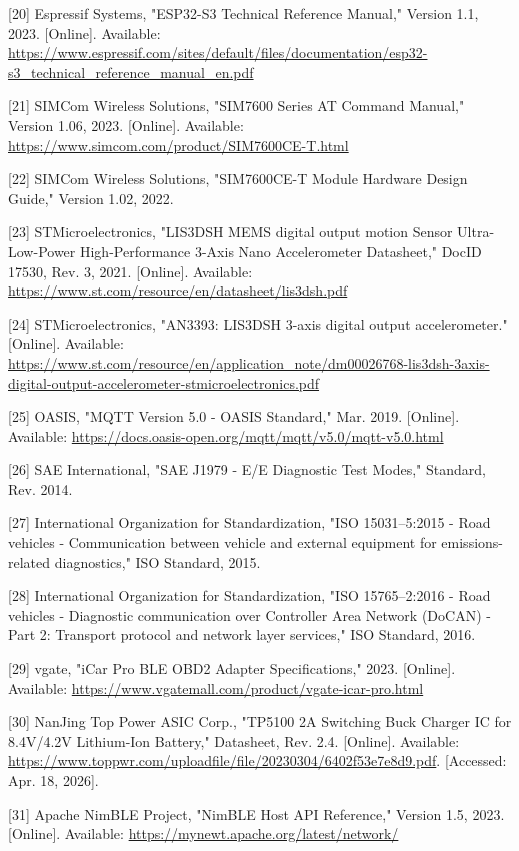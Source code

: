 \documentclass[a4paper]{extarticle}
\begin{document}
{[}20{]} Espressif Systems, "ESP32-S3 Technical Reference Manual,"
Version 1.1, 2023. {[}Online{]}. Available:
\url{https://www.espressif.com/sites/default/files/documentation/esp32-s3_technical_reference_manual_en.pdf}

{[}21{]} SIMCom Wireless Solutions, "SIM7600 Series AT Command Manual,"
Version 1.06, 2023. {[}Online{]}. Available:
\url{https://www.simcom.com/product/SIM7600CE-T.html}

{[}22{]} SIMCom Wireless Solutions, "SIM7600CE-T Module Hardware Design
Guide," Version 1.02, 2022.

{[}23{]} STMicroelectronics, "LIS3DSH MEMS digital output motion
Sensor Ultra-Low-Power High-Performance 3-Axis
\textquotesingle Nano\textquotesingle{} Accelerometer Datasheet," DocID
17530, Rev. 3, 2021. {[}Online{]}. Available:
\url{https://www.st.com/resource/en/datasheet/lis3dsh.pdf}

{[}24{]} STMicroelectronics, "AN3393: LIS3DSH 3-axis digital output accelerometer." {[}Online{]}. Available:
\url{https://www.st.com/resource/en/application_note/dm00026768-lis3dsh-3axis-digital-output-accelerometer-stmicroelectronics.pdf}

{[}25{]} OASIS, "MQTT Version 5.0 - OASIS Standard," Mar. 2019.
{[}Online{]}. Available:
\url{https://docs.oasis-open.org/mqtt/mqtt/v5.0/mqtt-v5.0.html}

{[}26{]} SAE International, "SAE J1979 - E/E Diagnostic Test Modes,"
Standard, Rev. 2014.

{[}27{]} International Organization for Standardization, "ISO
15031--5:2015 - Road vehicles - Communication between vehicle and
external equipment for emissions-related diagnostics," ISO Standard,
2015.

{[}28{]} International Organization for Standardization, "ISO
15765--2:2016 - Road vehicles - Diagnostic communication over Controller
Area Network (DoCAN) - Part 2: Transport protocol and network layer
services," ISO Standard, 2016.

{[}29{]} vgate, "iCar Pro BLE OBD2 Adapter Specifications," 2023.
{[}Online{]}. Available:
\url{https://www.vgatemall.com/product/vgate-icar-pro.html}

{[}30{]} NanJing Top Power ASIC Corp., "TP5100 2A Switching Buck Charger
IC for 8.4V/4.2V Lithium-Ion Battery," Datasheet, Rev. 2.4. {[}Online{]}. Available:
\url{https://www.toppwr.com/uploadfile/file/20230304/6402f53e7e8d9.pdf}. {[}Accessed: Apr. 18, 2026{]}.

{[}31{]} Apache NimBLE Project, "NimBLE Host API Reference," Version
1.5, 2023. {[}Online{]}. Available:
\url{https://mynewt.apache.org/latest/network/}
\end{document}
